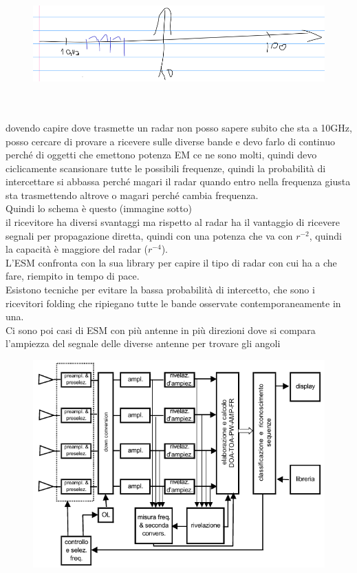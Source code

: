 \documentclass[oneside, 12pt]{extbook}
\begin{document}
\begin{figure}[!h]
	\includegraphics[scale=0.5]{immagini/localization/esm-freq.png}
\end{figure}\\\\
dovendo capire dove trasmette un radar non posso sapere subito che sta a 10GHz, posso cercare di provare a ricevere sulle diverse bande e devo farlo di continuo perché di oggetti che emettono potenza EM ce ne sono molti, quindi devo ciclicamente scansionare tutte le possibili frequenze, quindi la probabilità di intercettare si abbassa perché magari il radar quando entro nella frequenza giusta sta trasmettendo altrove o magari perché cambia frequenza.\\
Quindi lo schema è questo (immagine sotto)
\\il ricevitore ha diversi svantaggi ma rispetto al radar ha il vantaggio di ricevere segnali per propagazione diretta, quindi con una potenza che va con $r^{-2}$, quindi la capacità è maggiore del radar ($r^{-4}$).\\
L'ESM confronta con la sua library per capire il tipo di radar con cui ha a che fare, riempito in tempo di pace.\\
Esistono tecniche per evitare la bassa probabilità di intercetto, che sono i ricevitori folding che ripiegano tutte le bande osservate contemporaneamente in una.\\
Ci sono poi casi di ESM con più antenne in più direzioni dove si compara l'ampiezza del segnale delle diverse antenne per trovare gli angoli\\
\begin{figure}[!h]
	\includegraphics[scale=0.5]{immagini/localization/esm-multi.png}
\end{figure}\\\\
\end{document}
